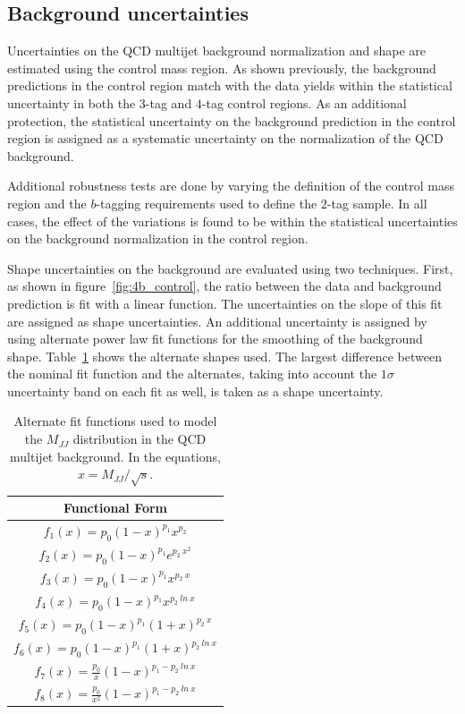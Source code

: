 \subsection{Background uncertainties}

Uncertainties on the QCD multijet background normalization and shape are estimated using the control mass region. As shown previously, the background predictions in the control region match with the data yields within the statistical uncertainty in both the $3$-tag and $4$-tag control regions. As an additional protection, the statistical uncertainty on the background prediction in the control region is assigned as a systematic uncertainty on the normalization of the QCD background. 

Additional robustness tests are done by varying the definition of the control mass region and the $b$-tagging requirements used to define the $2$-tag sample. In all cases, the effect of the variations is found to be within the statistical uncertainties on the background normalization in the control region. 

Shape uncertainties on the background are evaluated using two techniques. First, as shown in figure~\ref{fig:4b_control}, the ratio between the data and background prediction is fit with a linear function. The uncertainties on the slope of this fit are assigned as shape uncertainties. An additional uncertainty is assigned by using alternate power law fit functions for the smoothing of the background shape. Table~\ref{tab:SystFunctions} shows the alternate shapes used. The largest difference between the nominal fit function and the alternates, taking into account the $1\sigma$ uncertainty band on each fit as well, is taken as a shape uncertainty. 

\begin{table}[htbp!]
\begin{center} 
\begin{tabular}{|c|}
\hline
Functional Form \\
\hline
$f_{1}(x) = p_0 (1-x)^{p_1} x^{p_2}$ \\
$f_{2}(x) = p_0 (1-x)^{p_1} e^{p_2\ x^2}$ \\
$f_{3}(x) = p_0 (1-x)^{p_1} x^{p_2\ x}$ \\
$f_{4}(x) = p_0 (1-x)^{p_1} x^{p_2\ ln\ x}$ \\
$f_{5}(x) = p_0 (1-x)^{p_1} (1+x)^{p_2\ x}$ \\
$f_{6}(x) = p_0 (1-x)^{p_1} (1+x)^{p_2\ ln\ x}$ \\
$f_{7}(x) = \frac{p_0}{x} (1-x)^{p_1 - p_2\ ln\ x}$ \\
$f_{8}(x) = \frac{p_0}{x^2} (1-x)^{p_1 - p_2\ ln\ x}$ \\
\hline
\end{tabular}
\caption{Alternate fit functions used to model the $M_{JJ}$ distribution in the QCD multijet background. In the equations, $x = M_{JJ} / \sqrt{s}$.}
\label{tab:SystFunctions}
\end{center}
\end{table}

